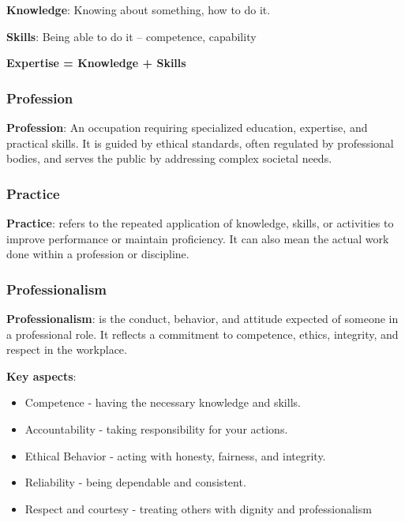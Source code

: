 \noindent\textbf{Knowledge}: Knowing about something, how to do it.

\noindent\textbf{Skills}: Being able to do it – competence, capability

\noindent\textbf{Expertise = Knowledge + Skills}

\subsubsection{Profession}

\noindent\textbf{Profession}: An occupation requiring specialized education, expertise, and practical skills. It is guided by ethical standards, often regulated by professional bodies, and serves the public by addressing complex societal needs.

\subsubsection{Practice}

\noindent\textbf{Practice}: refers to the repeated application of knowledge, skills, or activities to improve performance or maintain proficiency. It can also mean the actual work done within a profession or discipline.

\subsubsection{Professionalism}

\noindent\textbf{Professionalism}: is the conduct, behavior, and attitude expected of someone in a professional role. It reflects a commitment to competence, ethics, integrity, and respect in the workplace.

\bigskip

\noindent\textbf{Key aspects}:

\begin{itemize}
    \item Competence - having the necessary knowledge and skills.
    \item Accountability - taking responsibility for your actions.
    \item Ethical Behavior - acting with honesty, fairness, and integrity.
    \item Reliability - being dependable and consistent.
    \item Respect and courtesy - treating others with dignity and professionalism
\end{itemize}

